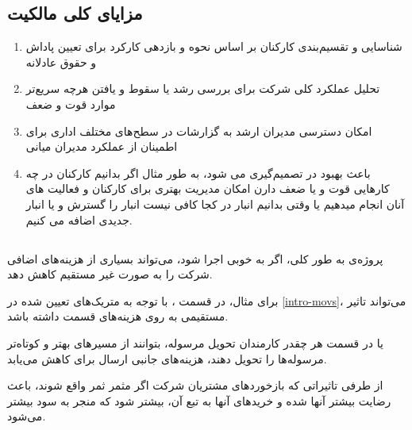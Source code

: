 \documentclass[12pt]{article}
\begin{document}
\subsection{مزایای کلی مالکیت }
\begin{enumerate}
    \item 
    شناسایی و تقسیم‌بندی کارکنان بر اساس نحوه و بازدهی کارکرد برای تعیین پاداش و حقوق عادلانه
    \item 
    تحلیل عملکرد کلی شرکت برای بررسی رشد یا سقوط و یافتن هرچه سریع‌تر موارد قوت و ضعف
    \item 
    امکان دسترسی مدیران ارشد به گزارشات در سطح‌های مختلف اداری برای اطمینان از عملکرد مدیران میانی 
    \item 
باعث بهبود در تصمیم‌گیری می شود، به طور مثال اگر بدانیم کارکنان در چه کارهایی قوت و یا ضعف دارن امکان مدیریت بهتری برای کارکنان و فعالیت های آنان انجام میدهیم یا وقتی بدانیم انبار در کجا کافی نیست انبار را گسترش و یا انبار جدیدی اضافه می کنیم.
\end{enumerate}
\subsection{}

پروژه‌ی  به طور کلی، اگر به خوبی اجرا شود، می‌تواند بسیاری از هزینه‌های اضافی شرکت  را به صورت غیر مستقیم کاهش دهد.

برای مثال، در قسمت ، با توجه به متریک‌های تعیین شده در \ref{intro-movs}، 
می‌تواند تاثیر مستقیمی به روی هزینه‌های قسمت  داشته باشد.

یا در قسمت  هر چقدر کارمندان تحویل مرسوله، بتوانند از مسیر‌های بهتر و کوتاه‌تر مرسوله‌ها را تحویل دهند، هزینه‌های جانبی ارسال برای  کاهش می‌یابد.

از طرفی تاثیراتی که بازخورد‌های مشتریان شرکت اگر مثمر ثمر واقع شوند، باعث رضایت بیشتر آنها شده و خرید‌‌های آنها به تبع آن، بیشتر شود که منجر به سود بیشتر 
می‌شود.
\end{document}

